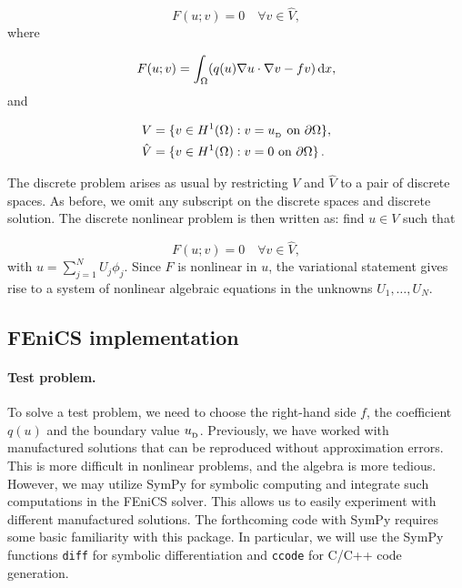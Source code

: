 \documentclass[graybox,envcountchap,sectrefs,final]{svmonodo}
\begin{document}
\begin{equation}
F(u; v) = 0 \quad \forall v \in \hat{V},
\label{ch:poisson0:nonlinear1}
\end{equation}
where

\begin{equation}
F(u; v) = \int_\Omega (q(u)\nabla u\cdot \nabla v - fv) \dx,
\label{ch:poisson0:nonlinear2}
\end{equation}
and

\begin{align*}
     V      &= \{v \in H^1(\Omega) : v = \ub \mbox{ on } \partial\Omega\},\\
    \hat{V} &= \{v \in H^1(\Omega) : v = 0 \mbox{ on } \partial\Omega\}\tp
\end{align*}

The discrete problem arises as usual by restricting $V$ and $\hat V$
to a pair of discrete spaces. As before, we omit any subscript on
the discrete spaces and discrete solution.
The discrete nonlinear problem is then written as: find $u\in V$ such that

\begin{equation}
  F(u; v) = 0 \quad \forall v \in \hat{V},
\label{ch:poisson0:nonlinear:d}
\end{equation}
with $u = \sum_{j=1}^N U_j \phi_j$. Since $F$ is nonlinear in
$u$, the variational statement gives rise to a system of
nonlinear algebraic equations in the unknowns $U_1,\ldots,U_N$.

\subsection{FEniCS implementation}
\label{ftut:nonlinear:Newton:auto}

\paragraph{Test problem.}
To solve a test problem, we need to choose the right-hand side $f$,
the coefficient $q(u)$ and the boundary value $\ub$.  Previously, we
have worked with manufactured solutions that can be reproduced without
approximation errors. This is more difficult in nonlinear problems,
and the algebra is more tedious. However, we may utilize SymPy for
symbolic computing and integrate such computations in the FEniCS
solver. This allows us to easily experiment with different
manufactured solutions. The forthcoming code with SymPy requires some
basic familiarity with this package. In particular, we will use the
SymPy functions \texttt{diff} for symbolic differentiation and \texttt{ccode} for
C/C++ code generation.
\end{document}
